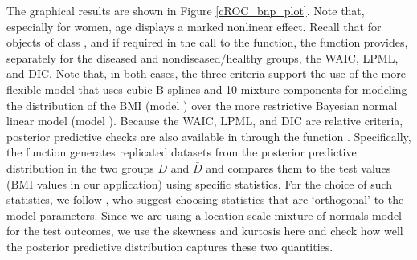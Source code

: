 The graphical results are shown in Figure \ref{cROC_bnp_plot}. Note that, especially for women, age displays a marked nonlinear effect. Recall that for objects of class , and if required in the call to the function, the  function provides, separately for the diseased and nondiseased/healthy groups, the WAIC, LPML, and DIC. Note that, in both cases, the three criteria support the use of the more flexible model that uses cubic B-splines and 10 mixture components for modeling the distribution of the BMI (model ) over the more restrictive Bayesian normal linear model (model ). Because the WAIC, LPML, and DIC are relative criteria, posterior predictive checks are also available in  through the function . Specifically, the function generates replicated datasets from the posterior predictive distribution in the two groups $D$ and $\bar{D}$ and compares them to the test values (BMI values in our application) using specific statistics. For the choice of such statistics, we follow \cite{Gabry2019}, who suggest choosing statistics that are `orthogonal' to the model parameters. Since we are using a location-scale mixture of normals model for the test outcomes, we use the skewness and kurtosis here and check how well the posterior predictive distribution captures these two quantities.

